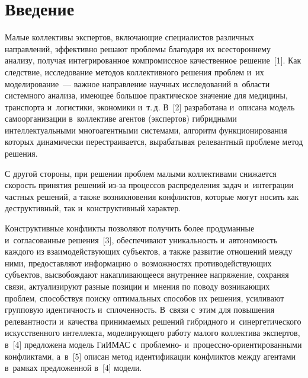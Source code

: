 
     
   \vspace*{2pt}
   
   
   
   \thispagestyle{headings}
   
   \begin{multicols}{2}
   
   \label{st\stat}

\section{Введение}

  Малые коллективы экспертов, включающие специалистов различных 
направлений, эффективно решают проблемы благодаря их всестороннему 
анализу, получая интегрированное компромиссное качественное решение~[1]. 
Как следствие, исследование методов коллективного решения проблем и~их 
моделирование~--- важное направление научных исследований в~области 
системного анализа, имеющее большое практическое значение для медицины, 
транспорта и~логистики, экономики и~т.\,д. %
В~[2] разработана и~описана 
модель самоорганизации в~коллективе агентов (экспертов) \mbox{гибридными}
интеллектуальными многоагентными системами, алгоритм 
функционирования которых динамически перестраивается, вырабатывая 
релевантный проблеме метод решения. 
  
  С другой стороны, при решении проблем малыми коллективами снижается 
скорость принятия решений из-за процессов распределения задач 
и~интеграции частных решений, а также возникновения конфликтов, которые 
могут носить как деструктивный, так и~конструктивный характер. 

Конструктивные конфликты позволяют получить более продуманные 
и~согласованные решения~[3], обеспечивают уникальность и~автономность 
каждого из взаимодействующих субъектов, а также развитие отношений 
между ними, предоставляют информацию о~возможностях 
противодействующих субъектов, высвобождают накапливающееся внут\-рен\-нее 
напряжение, сохраняя связи, актуализируют разные позиции и~мнения по 
поводу возникающих проблем, способствуя поиску оптимальных способов их 
решения, усиливают групповую идентичность и~сплоченность. В~связи с~этим 
для повышения релевантности и~качества принимаемых решений 
гибридного и~синергетического искусственного интеллекта, моделирующего работу 
малого коллектива экспертов, в~[4] предложена модель \mbox{ГиИМАС} 
с~проблемно- и~про\-цес\-сно-ори\-ен\-ти\-ро\-ван\-ны\-ми конфликтами, 
а~в~[5] описан метод идентификации конфликтов между агентами в~рамках 
предложенной в~[4] модели. 


\end{multicols}
